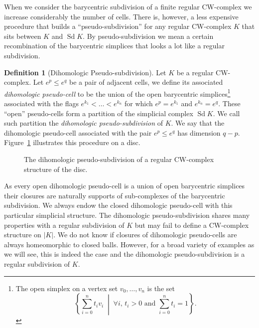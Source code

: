\documentclass[10pt]{amsart}
\theoremstyle{definition}
\newtheorem{defi}[theo]{Definition}
\numberwithin{equation}{section}
\numberwithin{figure}{section}
\DeclareMathOperator{\Sd}{Sd}
\let\oldforall\forall
\renewcommand*{\forall}{\mathrel{\oldforall}}
\begin{document}
When we consider the barycentric subdivision of a finite regular CW-complex we increase considerably the number of cells. There is, however, a less expensive procedure that builds a ``pseudo-subdivision'' for any regular CW-complex $K$ that sits between $K$ and $\Sd K$. By pseudo-subdivision we mean a certain recombination of the barycentric simplices that looks a lot like a regular subdivision.

\begin{defi}[Dihomologic Pseudo-subdivision]
Let $K$ be a regular CW-complex. Let $e^p\leq e^q$ be a pair of adjacent cells, we define its associated \emph{dihomologic pseudo-cell} to be the union of the open barycentric simplices\footnote{The open simplex on a vertex set $v_0,\dots,v_n$ is the set
\[
\left\{\sum_{i=0}^nt_iv_i\;\middle|\; \forall i,\,t_i>0\text{ and }\sum_{i=0}^nt_i=1\right\}.
\]
} associated with the flags $e^{k_1}<\dots<e^{k_n}$ for which $e^p= e^{k_1}$ and $e^{k_n}=e^q$. These ``open'' pseudo-cells form a partition of the simplicial complex $\Sd K$. We call such partition the \emph{dihomologic pseudo-subdivision} of $K$. We say that the dihomologic pseudo-cell associated with the pair $e^p\leq e^q$ has dimension $q-p$. Figure~\ref{fig:dih_sub_disc} illustrates this procedure on a disc.
\end{defi}

\begin{figure}[h]
\centering
{}
\caption{The dihomologic pseudo-subdivision of a regular CW-complex structure of the disc.}\label{fig:dih_sub_disc}
\end{figure}

As every open dihomologic pseudo-cell is a union of open barycentric simplices their closures are naturally supports of sub-complexes of the barycentric subdivision. We always endow the closed dihomologic pseudo-cell with this particular simplicial structure. The dihomologic pseudo-subdivision shares many properties with a regular subdivision of $K$ but may fail to define a CW-complex structure on $|K|$. We do not know if closures of dihomologic pseudo-cells are always homeomorphic to closed balls. However, for a broad variety of examples as we will see, this is indeed the case and the dihomologic pseudo-subdivision is a regular subdivision of $K$.
\end{document}
